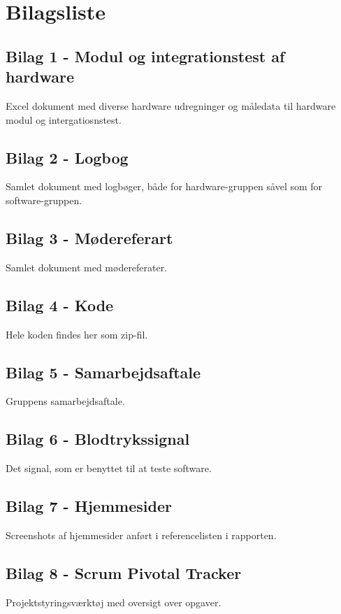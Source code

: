 \chapter{Bilagsliste}

\section{Bilag 1 - Modul og integrationstest af hardware}\label{Modul og integration}
Excel dokument med diverse hardware udregninger og måledata til hardware modul og intergatiosnstest.

\section{Bilag 2 - Logbog}\label{Logbog}
Samlet dokument med logbøger, både for hardware-gruppen såvel som for software-gruppen.

\section{Bilag 3 - Mødereferart}\label{Moedereferart}
Samlet dokument med mødereferater.

\section{Bilag 4 - Kode}\label{Kode}
Hele koden findes her som zip-fil.

\section{Bilag 5 - Samarbejdsaftale}\label{Samarbejdsaftale}
Gruppens samarbejdsaftale.

\section{Bilag 6 - Blodtrykssignal}\label{blodtrykssignal}
Det signal, som er benyttet til at teste software.

\section{Bilag 7 - Hjemmesider}\label{Hjemmesider}
Screenshots af hjemmesider anført i referencelisten i rapporten.

\section{Bilag 8 - Scrum Pivotal Tracker}
Projektstyringsværktøj med oversigt over opgaver.

